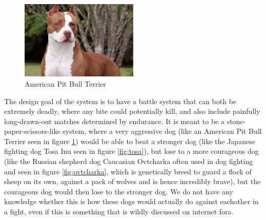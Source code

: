 \begin{figure} 
	\centering
    \includegraphics[width=0.5\textwidth]{pitbull.jpg}
    \caption{American Pit Bull Terrier}
    \label{fig:pitbull}
\end{figure}

The design goal of the system is to have a battle system that can both be extremely deadly, where any bite could potentially kill, and also include painfully long-drawn-out matches determined by endurance. It is meant to be a stone-paper-scissors-like system, where a very aggressive dog (like an American Pit Bull Terrier seen in figure \ref{fig:pitbull}) would be able to beat a stronger dog (like the Japanese fighting dog Tosa Inu seen in figure \ref{fig:tosa}), but lose to a more courageous dog (like the Russian shepherd dog Caucasian Ovtcharka often used in dog fighting and seen in figure \ref{fig:ovtcharka}, which is genetically breed to guard a flock of sheep on its own, against a pack of wolves and is hence incredibly brave), but the courageous dog would then lose to the stronger dog. We do not have any knowledge whether this is how these dogs would actually do against eachother in a fight, even if this is something that is wildly discussed on internet fora.\

